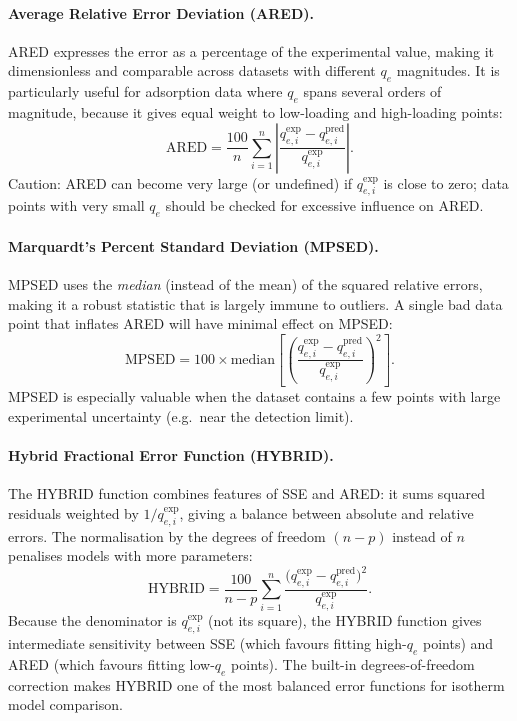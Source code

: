 \documentclass[12pt]{article}
\begin{document}
	\paragraph{Average Relative Error Deviation (ARED).}
	ARED expresses the error as a percentage of the experimental
	value, making it dimensionless and comparable across datasets
	with different $q_e$ magnitudes. It is particularly useful for
	adsorption data where $q_e$ spans several orders of magnitude,
	because it gives equal weight to low-loading and high-loading
	points:
	\begin{equation}
		\mathrm{ARED}
		= \frac{100}{n}\sum_{i=1}^{n}
		\left|
		\frac{q_{e,i}^{\exp} - q_{e,i}^{\mathrm{pred}}}
		{q_{e,i}^{\exp}}
		\right|.
		\label{eq:ARED}
	\end{equation}
	Caution: ARED can become very large (or undefined) if
	$q_{e,i}^{\exp}$ is close to zero; data points with very small
	$q_e$ should be checked for excessive influence on ARED.

	\paragraph{Marquardt's Percent Standard Deviation (MPSED).}
	MPSED uses the \emph{median} (instead of the mean) of the
	squared relative errors, making it a robust statistic that is
	largely immune to outliers. A single bad data point that
	inflates ARED will have minimal effect on MPSED:
	\begin{equation}
		\mathrm{MPSED}
		= 100 \times \mathrm{median}\!\left[
		\left(
		\frac{q_{e,i}^{\exp} - q_{e,i}^{\mathrm{pred}}}
		{q_{e,i}^{\exp}}
		\right)^{\!2}
		\right].
		\label{eq:MPSED}
	\end{equation}
	MPSED is especially valuable when the dataset contains a few
	points with large experimental uncertainty (e.g.\ near the
	detection limit).

	\paragraph{Hybrid Fractional Error Function (HYBRID).}
	The HYBRID function combines features of SSE and ARED: it sums
	squared residuals weighted by $1/q_{e,i}^{\exp}$, giving a
	balance between absolute and relative errors. The normalisation
	by the degrees of freedom $(n-p)$ instead of $n$ penalises
	models with more parameters:
	\begin{equation}
		\mathrm{HYBRID}
		= \frac{100}{n - p}\sum_{i=1}^{n}
		\frac{\bigl(q_{e,i}^{\exp} - q_{e,i}^{\mathrm{pred}}\bigr)^{2}}
		{q_{e,i}^{\exp}}.
		\label{eq:HYBRID}
	\end{equation}
	Because the denominator is $q_{e,i}^{\exp}$ (not its square),
	the HYBRID function gives intermediate sensitivity between SSE
	(which favours fitting high-$q_e$ points) and ARED (which
	favours fitting low-$q_e$ points). The built-in degrees-of-freedom
	correction makes HYBRID one of the most balanced error functions
	for isotherm model comparison.
\end{document}
